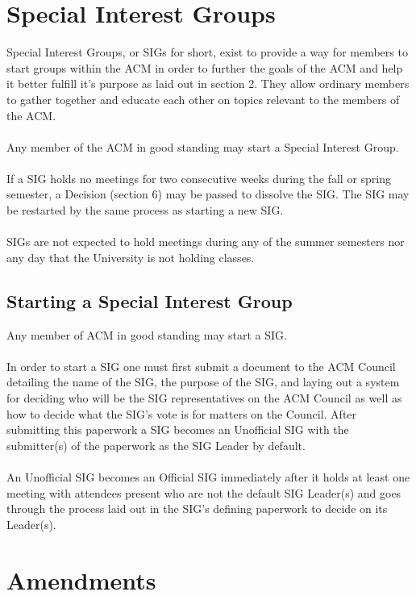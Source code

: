 \documentclass[12pt,titlepage]{article}
\begin{document}
\section{Special Interest Groups}

Special Interest Groups, or SIGs for short, exist to provide a way for members to start groups within the ACM in order to further the goals of the ACM and help it better fulfill it's purpose as laid out in section 2. They allow ordinary members to gather together and educate each other on topics relevant to the members of the ACM.\\
\\
Any member of the ACM in good standing may start a Special Interest Group.\\
\\
If a SIG holds no meetings for two consecutive weeks during the fall or spring semester, a Decision (section 6) may be passed to dissolve the SIG. The SIG may be restarted by the same process as starting a new SIG.\\
\\
SIGs are not expected to hold meetings during any of the summer semesters nor any day that the University is not holding classes. 

\subsection{Starting a Special Interest Group}

Any member of ACM in good standing may start a SIG.\\
\\
In order to start a SIG one must first submit a document to the ACM Council detailing the name of the SIG, the purpose of the SIG, and laying out a system for deciding who will be the SIG representatives on the ACM Council as well as how to decide what the SIG's vote is for matters on the Council. After submitting this paperwork a SIG becomes an Unofficial SIG with the submitter(s) of the paperwork as the SIG Leader by default.\\
\\
An Unofficial SIG becomes an Official SIG immediately after it holds at least one meeting with attendees present who are not the default SIG Leader(s) and goes through the process laid out in the SIG's defining paperwork to decide on its Leader(s).

\section{Amendments}
\end{document}
